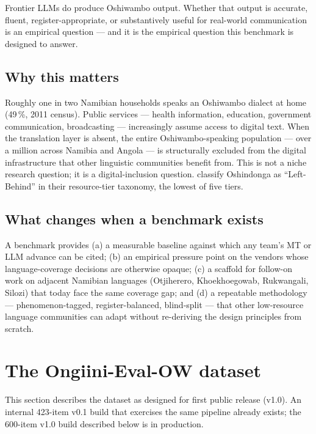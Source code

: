 \documentclass[11pt]{article}
\begin{document}
Frontier LLMs do produce Oshiwambo output. Whether that output is
accurate, fluent, register-appropriate, or substantively useful for
real-world communication is an empirical question --- and it is the
empirical question this benchmark is designed to answer.

\subsection{Why this matters}

Roughly one in two Namibian households speaks an Oshiwambo dialect
at home (49\,\%, 2011 census). Public services --- health
information, education, government communication, broadcasting ---
increasingly assume access to digital text. When the translation
layer is absent, the entire Oshiwambo-speaking population --- over
a million across Namibia and Angola --- is structurally excluded
from the digital infrastructure that other linguistic communities
benefit from. This is not a niche research question; it is a
digital-inclusion question. \citet{joshi2020state} classify
Oshindonga as ``Left-Behind'' in their resource-tier taxonomy, the
lowest of five tiers.

\subsection{What changes when a benchmark exists}

A benchmark provides (a) a measurable baseline against which any
team's MT or LLM advance can be cited; (b) an empirical pressure
point on the vendors whose language-coverage decisions are otherwise
opaque; (c) a scaffold for follow-on work on adjacent Namibian
languages (Otjiherero, Khoekhoegowab, Rukwangali, Silozi) that today
face the same coverage gap; and (d) a repeatable methodology ---
phenomenon-tagged, register-balanced, blind-split --- that other
low-resource language communities can adapt without re-deriving
the design principles from scratch.

\section{The Ongiini-Eval-OW dataset}
\label{sec:dataset}

This section describes the dataset as designed for first public
release (v1.0). An internal 423-item v0.1 build that exercises the
same pipeline already exists; the 600-item v1.0 build described
below is in production.
\end{document}

